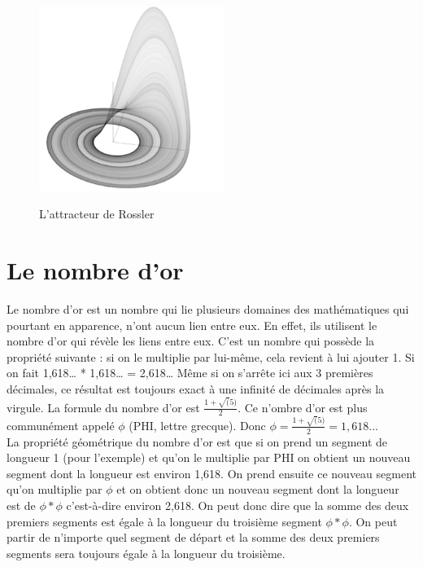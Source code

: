 \documentclass[french,11pt]{report}
\begin{document}
\begin{enumerate}
    \begin{figure} [!h]
        \centering
        \includegraphics[width=6cm]{rossler}
        \label{fig:rossler}
        \caption{L'attracteur de Rossler}
    \end{figure}


\end{enumerate}


\chapter{Le nombre d'or}

Le nombre d’or est un nombre qui lie plusieurs domaines des mathématiques qui pourtant en apparence, n’ont aucun lien entre eux. En effet, ils utilisent le nombre d’or qui révèle les liens entre eux.
C’est un nombre qui possède la propriété suivante : si on le multiplie par lui-même, cela revient à lui ajouter 1. Si on fait 1,618… * 1,618… = 2,618… Même si on s’arrête ici aux 3 premières décimales, ce résultat est toujours exact à une infinité de décimales après la virgule.
La formule du nombre d’or est \begin{math}\frac{1 + \sqrt(5)}{2}\end{math}. Ce n’ombre d’or est plus communément appelé \begin{math}\phi\end{math} (PHI, lettre grecque). Donc \begin{math}\phi = \frac{1 + \sqrt(5)}{2} = 1,618… \end{math}\\


La propriété géométrique du nombre d’or est que si on prend un segment de longueur 1 (pour l’exemple) et qu’on le multiplie par PHI on obtient un nouveau segment dont la longueur est environ 1,618. On prend ensuite ce nouveau segment qu’on multiplie par \begin{math}\phi\end{math} et on obtient donc un nouveau segment dont la longueur est de \begin{math}\phi * \phi\end{math} c’est-à-dire environ 2,618. On peut donc dire que la somme des deux premiers segments est égale à la longueur du troisième segment \begin{math}\phi * \phi\end{math}. On peut partir de n’importe quel segment de départ et la somme des deux premiers segments sera toujours égale à la longueur du troisième.\\
\end{document}

